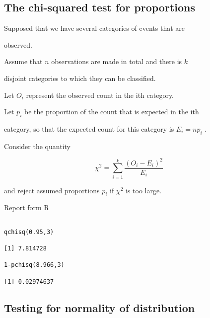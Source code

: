 

 

\subsection{The chi-squared test for proportions}

 

Supposed that we have several categories of events that are

observed.

Assume that $n$ observations are made in total and there is $k$

disjoint categories to which they can be classified.

Let $O_i$ represent the observed count in the ith category.

Let $p_i$ be the proportion of the count that is expected in the ith

category, so that the expected count for this category is $E_i = np_i$ .

Consider the quantity

\[ \chi^2 = \sum^{k}_{i=1}\frac{(O_i-E_i)^2}{E_i} \]

 

and reject assumed proportions $p_i$ if $\chi^2$ is too large.

 






Report form R

\begin{verbatim}

qchisq(0.95,3)

[1] 7.814728

1-pchisq(8.966,3)

[1] 0.02974637

\end{verbatim}


 

\subsection{Testing for normality of distribution}

